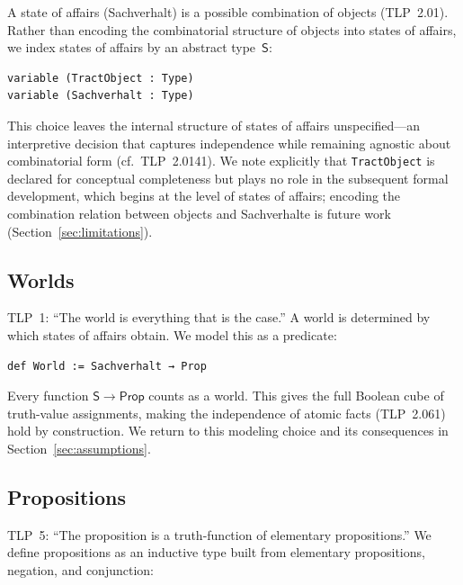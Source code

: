 \documentclass[10pt, letterpaper]{article}
\theoremstyle{definition}
\theoremstyle{remark}
\newcommand{\Sach}{\mathsf{S}}
\newcommand{\Prop}{\mathsf{Prop}}
\begin{document}
A state of affairs (Sachverhalt) is a possible combination of
objects (TLP~2.01).  Rather than encoding the combinatorial
structure of objects into states of affairs, we index states of
affairs by an abstract type~$\Sach$:

\begin{lstlisting}
variable (TractObject : Type)
variable (Sachverhalt : Type)
\end{lstlisting}

\noindent
This choice leaves the internal structure of states of affairs
unspecified---an interpretive decision that captures independence
while remaining agnostic about combinatorial form (cf.\
TLP~2.0141).  We note explicitly that \texttt{TractObject} is
declared for conceptual completeness but plays no role in the
subsequent formal development, which begins at the level of
states of affairs; encoding the combination relation between
objects and Sachverhalte is future work
(Section~\ref{sec:limitations}).

\subsection{Worlds}
\label{sec:worlds}

TLP~1: ``The world is everything that is the case.''
A world is determined by which states of affairs obtain.  We
model this as a predicate:

\begin{lstlisting}
def World := Sachverhalt → Prop
\end{lstlisting}

\noindent
Every function $\Sach \to \Prop$ counts as a world.  This gives
the full Boolean cube of truth-value assignments, making the
independence of atomic facts (TLP~2.061) hold by construction.
We return to this modeling choice and its consequences in
Section~\ref{sec:assumptions}.

\subsection{Propositions}
\label{sec:propositions}

TLP~5: ``The proposition is a truth-function of elementary
propositions.''  We define propositions as an inductive type
built from elementary propositions, negation, and conjunction:
\end{document}
